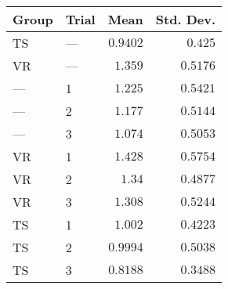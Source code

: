 \begin{tabular}{llrr}
\toprule
Group & Trial &     Mean &  Std. Dev. \\
\midrule
   TS &   --- & $0.9402$ &    $0.425$ \\
   VR &   --- &  $1.359$ &   $0.5176$ \\
  --- &     1 &  $1.225$ &   $0.5421$ \\
  --- &     2 &  $1.177$ &   $0.5144$ \\
  --- &     3 &  $1.074$ &   $0.5053$ \\
   VR &     1 &  $1.428$ &   $0.5754$ \\
   VR &     2 &   $1.34$ &   $0.4877$ \\
   VR &     3 &  $1.308$ &   $0.5244$ \\
   TS &     1 &  $1.002$ &   $0.4223$ \\
   TS &     2 & $0.9994$ &   $0.5038$ \\
   TS &     3 & $0.8188$ &   $0.3488$ \\
\bottomrule
\end{tabular}
